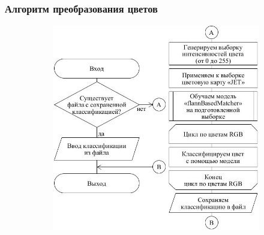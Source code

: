 \documentclass[t]{beamer}
\begin{document}
	\begin{frame}
		\frametitle{Алгоритм преобразования цветов}
		\vspace*{-0.45cm}
		\begin{figure}[ht!]
			\begin{subfigure}{.52\textwidth}
				\centering
				\includegraphics[width = \textwidth]{image/chapter_2/colorclassification}
				\vspace*{-0.6cm}
				\caption{}
			\end{subfigure}
			\begin{subfigure}{.22\textwidth}
				\centering

\end{subfigure}
\end{figure}
\end{frame}
\end{document}
